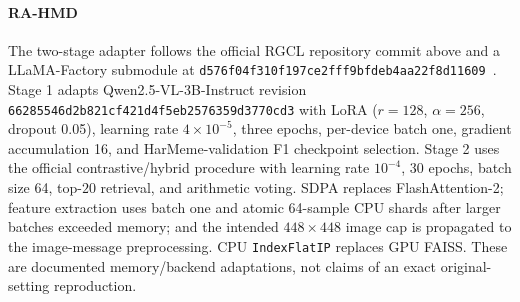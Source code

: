 \paragraph{RA-HMD}
The two-stage adapter follows the official RGCL repository commit above and a
LLaMA-Factory submodule at
\nolinkurl{d576f04f310f197ce2fff9bfdeb4aa22f8d11609}~\cite{mei2025rahmd}.  Stage
1 adapts Qwen2.5-VL-3B-Instruct revision
\nolinkurl{66285546d2b821cf421d4f5eb2576359d3770cd3} with LoRA
($r=128$, $\alpha=256$, dropout 0.05), learning rate $4\times10^{-5}$, three
epochs, per-device batch one, gradient accumulation 16, and HarMeme-validation
F1 checkpoint selection.  Stage 2 uses the official contrastive/hybrid
procedure with learning rate $10^{-4}$, 30 epochs, batch size 64, top-$20$
retrieval, and arithmetic voting.  SDPA replaces FlashAttention-2; feature
extraction uses batch one and atomic 64-sample CPU shards after larger batches
exceeded memory; and the intended $448\times448$ image cap is propagated to
the image-message preprocessing.  CPU \texttt{IndexFlatIP} replaces GPU FAISS.
These are documented memory/backend adaptations, not claims of an exact
original-setting reproduction.
